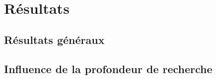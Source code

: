 \documentclass[a4paper, 10pt, french]{article}
\begin{document}
\section{Résultats}
{

    \subsection{Résultats généraux}
    {
    }

    \subsection{Influence de la profondeur de recherche}
    {
    }
}
\end{document}
